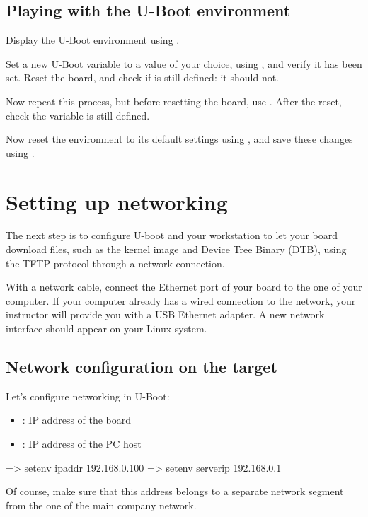 \subsection{Playing with the U-Boot environment}

Display the U-Boot environment using .

Set a new U-Boot variable  to a value of your choice, using
, and verify it has been set. Reset the board, and check
if  is still defined: it should not.

Now repeat this process, but before resetting the board, use
. After the reset, check the  variable is
still defined.

Now reset the environment to its default settings using , and save these changes using .

\section{Setting up networking}

The next step is to configure U-boot and your workstation to let your
board download files, such as the kernel image and Device Tree Binary
(DTB), using the TFTP protocol through a network connection.

With a network cable, connect the Ethernet port of
your board to the one of your computer. If your computer already has a
wired connection to the network, your instructor will provide you with
a USB Ethernet adapter. A new network interface should appear on your
Linux system.

\subsection{Network configuration on the target}

Let's configure networking in U-Boot:

\begin{itemize}
  \item {}: IP address of the board
  \item {}: IP address of the PC host
\end{itemize}

\begin{ubootinput}
=> setenv ipaddr 192.168.0.100
=> setenv serverip 192.168.0.1
\end{ubootinput}

Of course, make sure that this address belongs to a separate network
segment from the one of the main company network.

